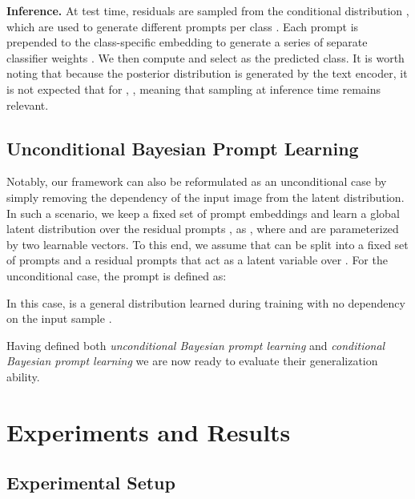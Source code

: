 \documentclass[10pt,twocolumn,letterpaper]{article}
\begin{document}
\textbf{Inference.} At test time,  residuals are sampled from the conditional distribution , which are used to generate  different prompts per class . Each prompt is prepended to the class-specific embedding to generate a series of  separate classifier weights . We then compute  and select  as the predicted class. It is worth noting that because the posterior distribution is generated by the text encoder, it is not expected that for , , meaning that sampling at inference time remains relevant. 



\subsection{Unconditional Bayesian Prompt Learning}
\label{ssec:method_unconditional}
Notably, our framework can also be reformulated as an unconditional case  by simply removing the dependency of the input image from the latent distribution. In such a scenario, we keep a fixed set of prompt embeddings and learn a global latent distribution  over the residual prompts , as , where  and  are parameterized by two learnable vectors. To this end, we assume that  can be split into a fixed set of prompts  and a residual prompts  that act as a latent variable over . For the unconditional case, the prompt is defined as:

In this case,  is a general distribution learned during training with no dependency on the input sample . 

Having defined both \textit{unconditional Bayesian prompt learning} and \textit{conditional Bayesian prompt learning} we are now ready to evaluate their generalization ability. \section{Experiments and Results}
\vspace{-0.5em}
\label{sec:experiments}

\subsection{Experimental Setup}
\end{document}
